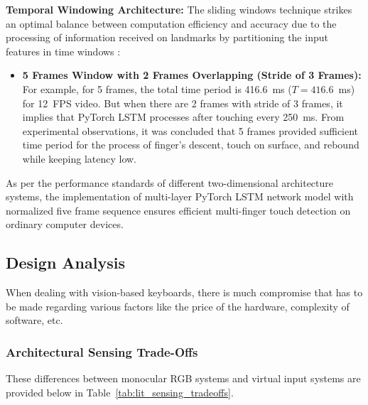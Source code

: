 \textbf{Temporal Windowing Architecture:} 
The sliding windows technique strikes an optimal balance between computation efficiency and accuracy due to the processing of information received on landmarks by partitioning the input features in time windows \cite{Simao2016Unsupervised, Doan2022Efficient, Gammulle2021TMMF}:
\begin{itemize}
    \item \textbf{5 Frames Window with 2 Frames Overlapping (Stride of 3 Frames):} For example, for 5 frames, the total time period is 416.6~ms ($T = 416.6$~ms) for 12~FPS video. But when there are 2 frames with stride of 3 frames, it implies that PyTorch LSTM processes after touching every 250~ms. From experimental observations, it was concluded that 5 frames provided sufficient time period for the process of finger's descent, touch on surface, and rebound while keeping latency low.
\end{itemize}

As per the performance standards of different two-dimensional architecture systems, the implementation of multi-layer PyTorch LSTM network model with normalized five frame sequence ensures efficient multi-finger touch detection on ordinary computer devices.

\subsection{Design Analysis}
\label{subsec:lit_design_analysis}
When dealing with vision-based keyboards, there is much compromise that has to be made regarding various factors like the price of the hardware, complexity of software, etc.

\subsubsection{Architectural Sensing Trade-Offs}
These differences between monocular RGB systems and virtual input systems are provided below in Table~\ref{tab:lit_sensing_tradeoffs}.

